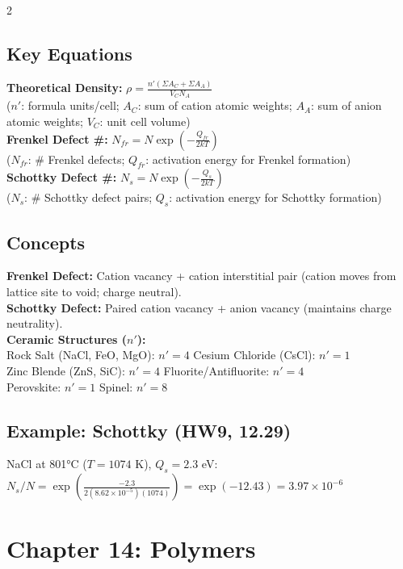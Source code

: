\documentclass[8pt]{extarticle}
\begin{document}
\begin{multicols*}{2}
\subsection*{Key Equations}
\textbf{Theoretical Density:} $\rho = \frac{n'(\Sigma A_C + \Sigma A_A)}{V_C N_A}$ \\
($n'$: formula units/cell; $A_C$: sum of cation atomic weights; $A_A$: sum of anion atomic weights; $V_C$: unit cell volume) \\
\textbf{Frenkel Defect \#:} $N_{fr} = N\exp\!\left(-\frac{Q_{fr}}{2kT}\right)$ \\
($N_{fr}$: \# Frenkel defects; $Q_{fr}$: activation energy for Frenkel formation) \\
\textbf{Schottky Defect \#:} $N_s = N\exp\!\left(-\frac{Q_s}{2kT}\right)$ \\
($N_s$: \# Schottky defect pairs; $Q_s$: activation energy for Schottky formation)
\subsection*{Concepts}
\textbf{Frenkel Defect:} Cation vacancy + cation interstitial pair (cation moves from lattice site to void; charge neutral). \\
\textbf{Schottky Defect:} Paired cation vacancy + anion vacancy (maintains charge neutrality). \\
\textbf{Ceramic Structures ($n'$):} \\
Rock Salt (NaCl, FeO, MgO): $n'=4$ \quad Cesium Chloride (CsCl): $n'=1$ \\
Zinc Blende (ZnS, SiC): $n'=4$ \quad Fluorite/Antifluorite: $n'=4$ \\
Perovskite: $n'=1$ \quad Spinel: $n'=8$
\subsection*{Example: Schottky (HW9, 12.29)}
NaCl at 801°C ($T=1074$ K), $Q_s=2.3$ eV: \\
$N_s/N = \exp\!\left(\frac{-2.3}{2(8.62\times10^{-5})(1074)}\right) = \exp(-12.43) = 3.97\times10^{-6}$

\section*{Chapter 14: Polymers}

\end{multicols*}
\end{document}
